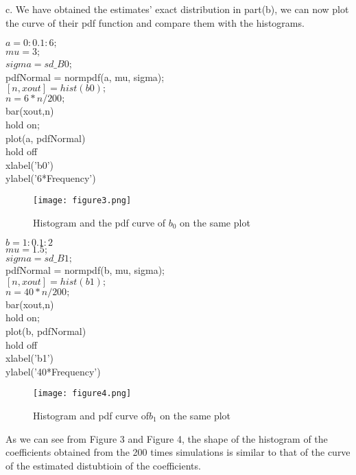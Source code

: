 \documentclass[12pt]{article}
\begin{document}
{c. We have obtained the estimates' exact distribution in part(b), we can now plot the curve of their pdf function and compare them with the histograms. 

$a = 0:0.1:6;$\\
$mu = 3;$\\
$sigma =sd\_B0$;\\
pdfNormal = normpdf(a, mu, sigma);\\
$[n,xout]=hist(b0);$\\
$n=6*n/200;$\\
bar(xout,n)\\
hold on;\\
plot(a, pdfNormal)\\
hold off\\
xlabel('b0')\\
ylabel('6*Frequency')\\

\begin{figure}[h!]
\centering
\graphicspath{{c:/users/qun/desktop/}}
\texttt{[image: figure3.png]}
\caption{Histogram and the pdf curve of $b_0$ on the same plot}
\end{figure}

$b=1:0.1:2$\\
$mu=1.5;$\\
$sigma=sd\_B1;$\\
pdfNormal = normpdf(b, mu, sigma);\\
$[n,xout]=hist(b1);$\\
$n=40*n/200;$\\
bar(xout,n)\\
hold on;\\
plot(b, pdfNormal)\\
hold off\\
xlabel('b1')\\
ylabel('40*Frequency')\\

\begin{figure}[h]
\centering
\graphicspath{{c:/users/qun/desktop/}}
\texttt{[image: figure4.png]}
\caption{Histogram and pdf curve of$ b_1$ on the same plot}
\end{figure}
As we can see from Figure 3 and Figure 4, the shape of the histogram of the coefficients obtained from the 200 times simulations is similar to that of the curve of the estimated distubtioin of the coefficients. 
}
\end{document}
